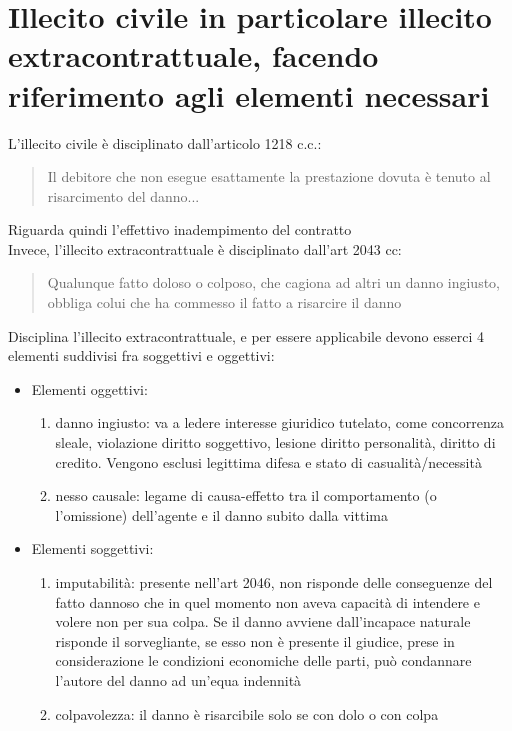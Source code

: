 \documentclass[8pt,oneside,a4paper]{article}
\begin{document}
	\section{Illecito civile in particolare illecito extracontrattuale, facendo riferimento agli elementi necessari}
	L'illecito civile è disciplinato dall'articolo 1218 c.c.:
	\begin{quote}
		Il debitore che non esegue esattamente la prestazione dovuta è tenuto al risarcimento del danno...
	\end{quote}
	Riguarda quindi l'effettivo inadempimento del contratto\\
	Invece, l'illecito extracontrattuale è disciplinato dall'art 2043 cc:
	\begin{quote}
		Qualunque fatto doloso o colposo, che cagiona ad altri un danno ingiusto, obbliga colui che ha commesso il fatto a risarcire il danno
	\end{quote}
	Disciplina l'illecito extracontrattuale, e per essere applicabile devono esserci 4 elementi suddivisi fra soggettivi e oggettivi:
	\begin{itemize}
		\item Elementi oggettivi:
		\begin{enumerate}
			\item danno ingiusto: va a ledere interesse giuridico tutelato, come concorrenza sleale, violazione diritto soggettivo, lesione diritto personalità, diritto di credito. Vengono esclusi legittima difesa e stato di casualità/necessità
			\item nesso causale: legame di causa-effetto tra il comportamento (o l’omissione) dell’agente e il danno subito dalla vittima
		\end{enumerate}
		\item Elementi soggettivi:
		\begin{enumerate}
			\item imputabilità: presente nell'art 2046, non risponde delle conseguenze del fatto dannoso che in quel momento non aveva capacità di intendere e volere non per sua colpa. Se il danno avviene dall'incapace naturale risponde il sorvegliante, se esso non è presente il giudice, prese in considerazione le condizioni economiche delle parti, può condannare l'autore del danno ad un'equa indennità
			\item colpavolezza: il danno è risarcibile solo se con dolo o con colpa
		\end{enumerate}
	\end{itemize}
\end{document}
